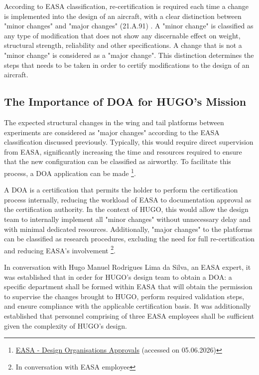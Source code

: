 According to EASA classification, re-certification is required each time a change is implemented into the design of an aircraft, with a clear distinction between "minor changes" and "major changes"
(21.A.91) \cite{EASAInitialAirworthiness2025}. A "minor change" is classified as any type of modification that does not show any discernable effect on weight, structural strength, reliability and other specifications. A change that is not a "minor change" is considered as a "major change". This distinction determines the steps that needs to be taken in order to certify modifications to the design of an aircraft.


\subsection{The Importance of DOA for HUGO's Mission}
The expected structural changes in the wing and tail platforms between experiments are considered as "major changes" according to the EASA classification discussed previously. Typically, this would require direct supervision from EASA, significantly increasing the time and resources required to ensure that the new configuration can be classified as airworthy. To facilitate this process, a DOA application can be made \footnote{\label{DOA_site}\href{https://www.easa.europa.eu/en/domains/aircraft-products/design-organisations/design-organisations-approvals}{EASA - Design Organisations Approvals} (accessed on 05.06.2026)}.

A  DOA is a certification that permits the holder to perform the certification process internally, reducing the workload of EASA to documentation approval as the certification authority. In the context of HUGO, this would allow the design team to internally implement all "minor changes" without unnecessary delay and with minimal dedicated resources. Additionally, "major changes" to the platforms can be classified as research procedures, excluding the need for full re-certification and reducing EASA's involvement \footnote{In conversation with EASA employee}.


In conversation with Hugo Manuel Rodrigues Lima da Silva, an EASA expert, it was established that in order for HUGO's design team to obtain a DOA: a specific department shall be formed within EASA that will obtain the permission to supervise the changes brought to HUGO, perform required validation steps, and ensure compliance with the applicable certification basis. It was additionally established that personnel comprising of three EASA employees shall be sufficient given the complexity of HUGO's design. 

